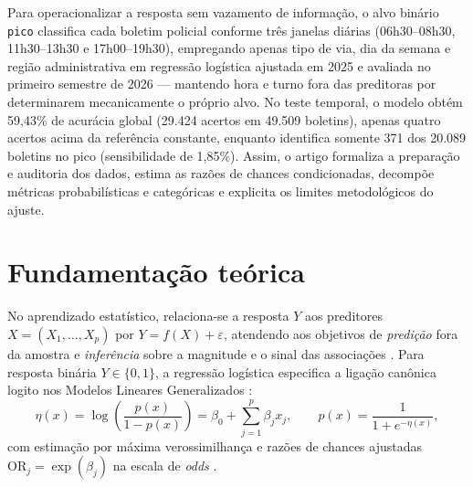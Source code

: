 \documentclass[
  article,
  12pt,
  oneside,
  a4paper,
  section=TITLE,
  english,
  brazil
]{abntex2}\usepackage[]{graphicx}\usepackage[]{xcolor}
\begin{document}
Para operacionalizar a resposta sem vazamento de informação, o alvo binário \texttt{pico} classifica cada boletim policial conforme três janelas diárias (06h30--08h30, 11h30--13h30 e 17h00--19h30), empregando apenas tipo de via, dia da semana e região administrativa em regressão logística ajustada em 2025 e avaliada no primeiro semestre de 2026 --- mantendo hora e turno fora das preditoras por determinarem mecanicamente o próprio alvo. No teste temporal, o modelo obtém 59,43\% de acurácia global (29.424 acertos em 49.509 boletins), apenas quatro acertos acima da referência constante, enquanto identifica somente 371 dos 20.089 boletins no pico (sensibilidade de 1,85\%). Assim, o artigo formaliza a preparação e auditoria dos dados, estima as razões de chances condicionadas, decompõe métricas probabilísticas e categóricas e explicita os limites metodológicos do ajuste.

\section{Fundamentação teórica}

No aprendizado estatístico, relaciona-se a resposta $Y$ aos preditores $X = (X_1, \ldots, X_p)$ por $Y = f(X) + \varepsilon$, atendendo aos objetivos de \textit{predição} fora da amostra e \textit{inferência} sobre a magnitude e o sinal das associações \parencite{james2021,hastie2009}. Para resposta binária $Y \in \{0, 1\}$, a regressão logística especifica a ligação canônica logito nos Modelos Lineares Generalizados \parencite{mccullagh1989,james2021}:
\begin{equation}
  \eta(x) = \log\!\left(\frac{p(x)}{1 - p(x)}\right) = \beta_0 + \sum_{j=1}^{p} \beta_j x_j,
  \qquad
  p(x) = \frac{1}{1 + e^{-\eta(x)}},
\end{equation}
com estimação por máxima verossimilhança e razões de chances ajustadas $\mathrm{OR}_j = \exp(\beta_j)$ na escala de \textit{odds} \parencite{bruce2019}.
\end{document}
